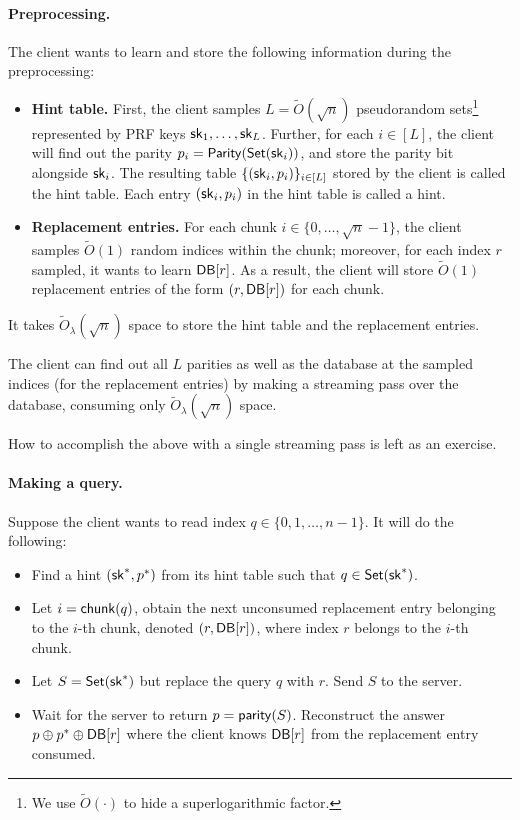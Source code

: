 \paragraph{Preprocessing.}
The client wants to learn and store the following information during the preprocessing:  
\begin{itemize}
\item 
{\bf Hint table.}
First, the client samples
$L = \widetilde{O}(\sqrt{n})$
pseudorandom sets\footnote{We use $\widetilde{O}(\cdot)$ to hide
a superlogarithmic factor.} represented by PRF keys ${\sf sk}_1, \ldots, {\sf sk}_L$.
Further, for each $i \in [L]$, the client will 
find out the parity 
$p_i = {\sf Parity}({\sf Set}({\sf sk}_i))$, and store the parity bit alongside ${\sf sk}_i$.
The resulting table $\{({\sf sk}_i, p_i)\}_{i \in [L]}$ 
stored by the client
is called the hint table.
Each entry $({\sf sk}_i, p_i)$ in the hint table is called a hint.
\item 
{\bf Replacement entries.}
For each chunk $i \in \{0, \ldots, \sqrt{n}-1\}$, the client
samples $\widetilde{O}(1)$
random indices within the chunk; moreover, for each index $r$ sampled,
it wants to learn ${\sf DB}[r]$.  
As a result, the client will store $\widetilde{O}(1)$
replacement entries of the form $(r, {\sf DB}[r])$ for each chunk. 
\end{itemize}

It takes $\widetilde{O}_\lambda(\sqrt{n})$ space to
store the hint table and the replacement entries.

\begin{claim}
The client can find out all $L$ parities
as well as
the database at the sampled indices (for the replacement entries)
by making a streaming pass over the database, consuming
only $\widetilde{O}_\lambda(\sqrt{n})$ space.
\end{claim}
How to accomplish the above with a single streaming pass is left as an exercise.

\paragraph{Making a query.}
Suppose the client wants to read index
$q \in \{0, 1, \ldots, n-1\}$.
It will do the following: 
\begin{itemize}
\item 
Find a hint $({\sf sk}^*, p^*)$
from its hint table such that $q \in {\sf Set}({\sf sk}^*)$.
\item 
Let $i = {\sf chunk}(q)$, obtain the next unconsumed
replacement entry belonging to the $i$-th chunk, denoted $(r, {\sf DB}[r])$,
where index $r$ belongs
to the $i$-th chunk.
\item 
Let $S = {\sf Set}({\sf sk}^*)$ but 
replace the query $q$ with $r$. 
Send $S$ to the server. 
\item 
Wait for the server to return 
$p = {\sf parity}(S)$.
Reconstruct the answer $p \oplus p^* \oplus {\sf DB}[r]$ where the client knows ${\sf DB}[r]$
from the replacement entry consumed.
\end{itemize}


